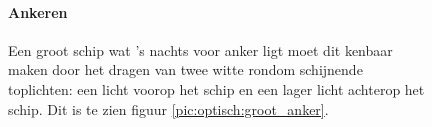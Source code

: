 \begin{figure}[H]
	\centering
	\begin{minipage}[t]{0.50\textwidth}
		\paragraph{Ankeren}
		Een groot schip wat 's nachts voor anker ligt moet dit kenbaar maken door het dragen van twee witte rondom schijnende toplichten: een licht voorop het schip en een lager licht achterop het schip. Dit is te zien figuur \ref{pic:optisch:groot_anker}.		
	\end{minipage}
	\hfill
	\begin{minipage}[t]{0.22\textwidth}
		\RemoveLine
		\caption{}
		\label{pic:optisch:groot_anker}
	\end{minipage}
	\hfill
	\begin{minipage}[t]{0.22\textwidth}
	\RemoveLine
	\caption{}
	\label{pic:optisch:groot_anker2}
	\end{minipage}
\end{figure}
